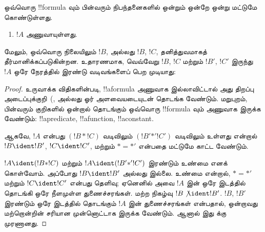 \documentclass[../../../include/open-logic-section]{subfiles}
\begin{document}
\begin{prop}[தனித்த வாசிப்புத்தன்மை]
ஒவ்வொரு !!{formula} வும் பின்வரும் நிபந்தனைகளில் ஒன்றும் ஒன்றே ஒன்று
மட்டுமே கொண்டுள்ளது.
\begin{enumerate}
\item $!A$ அணுவாயுள்ளது.







\end{enumerate}
மேலும், ஒவ்வொரு நிலையிலும் $!B$, அல்லது $!B$, $!C$, தனித்துவமாகத்
தீர்மானிக்கப்படுகின்றன. உதாரணமாக, வெவ்வேறு $!B$, $!C$ மற்றும் $!B'$, $!C'$
இருந்து $!A$ ஒரே நேரத்தில் இரண்டு வடிவங்களைப் பெற முடியாது:
\end{prop}

\begin{proof}
உருவாக்க விதிகளின்படி, !!a{formula} அணுவாக இல்லாவிட்டால் அது திறப்பு
அடைப்புக்குறி~(,  அல்லது ஓர் அளவையடையுடன்
தொடங்க வேண்டும். மறுபுறம், பின்வரும் குறிகளில் ஒன்றால் தொடங்கும் ஒவ்வொரு
!!{formula} வும் அணுவாக இருக்க வேண்டும்: !!a{predicate}, !!a{function},
!!a{constant}.

ஆகவே, $!A$ என்பது $(!B \ast !C)$ வடிவிலும் $(!B' \mathbin{\ast'} !C')$
வடிவிலும் உள்ளது என்றால் $!B \ident !B'$, $!C \ident !C'$, மற்றும்
$\ast = {\ast'}$ என்பதை மட்டுமே காட்ட வேண்டும்.

$!A \ident (!B \ast !C)$ மற்றும் $!A \ident (!B' \mathbin{\ast'} !C')$
இரண்டும் உண்மை எனக் கொள்வோம். அப்போது $!B \ident !B'$ அல்லது இல்லை.
உண்மை என்றால், $\ast = {\ast'}$ மற்றும் $!C \ident !C'$ என்பது தெளிவு;
ஏனெனில் அவை $!A$ இன் ஒரே இடத்தில் தொடங்கி ஒரே நீளமுள்ள துணைச்சரங்கள்.
மற்ற நிகழ்வு $!B \not\ident !B'$. $!B$, $!B'$ இரண்டும் ஒரே இடத்தில்
தொடங்கும் $!A$ இன் துணைச்சரங்கள் என்பதால், ஒன்றாவது மற்றொன்றின் சரியான
முன்னொட்டாக இருக்க வேண்டும். ஆனால் இது  க்கு முரணானது.
\end{proof}
\end{document}
